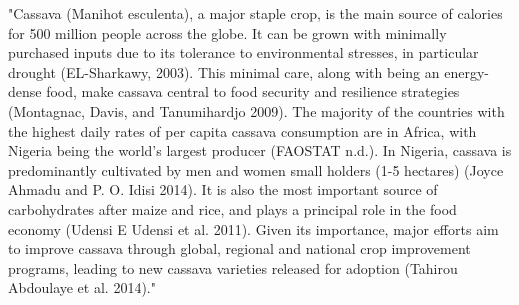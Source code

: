\documentclass[12pt]{article}
\begin{document}
	"Cassava (Manihot esculenta), a major staple crop, is the main source of calories for 500 million people across the globe. It can be grown with minimally purchased inputs due to its tolerance to environmental stresses, in particular drought (EL-Sharkawy, 2003). This minimal care, along with being an energy-dense food, make cassava central to food security and resilience strategies (Montagnac, Davis, and Tanumihardjo 2009). The majority of the countries with the highest daily rates of per capita cassava consumption are in Africa, with Nigeria being the world’s largest producer (FAOSTAT n.d.). In Nigeria, cassava is predominantly cultivated by men and women small holders (1-5 hectares) (Joyce Ahmadu and P. O. Idisi 2014). It is also the most important source of carbohydrates after maize and rice, and plays a principal role in the food economy (Udensi E Udensi et al. 2011). Given its importance, major efforts aim to improve cassava through global, regional and national crop improvement programs, leading to new cassava varieties released for adoption (Tahirou Abdoulaye et al. 2014)."
	
\end{document}
